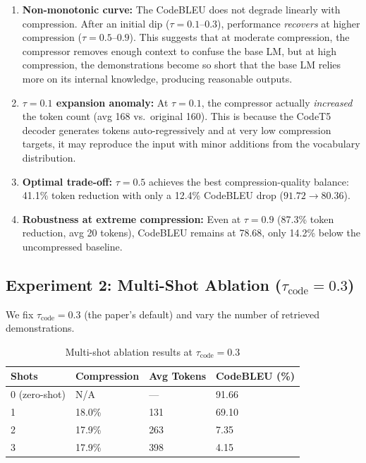 \documentclass[11pt,a4paper]{article}
\begin{document}
\begin{enumerate}[leftmargin=1.5em]
  \item \textbf{Non-monotonic curve:} The CodeBLEU does not degrade linearly with compression. After an initial dip ($\tau=0.1$--$0.3$), performance \emph{recovers} at higher compression ($\tau=0.5$--$0.9$). This suggests that at moderate compression, the compressor removes enough context to confuse the base LM, but at high compression, the demonstrations become so short that the base LM relies more on its internal knowledge, producing reasonable outputs.

  \item \textbf{$\tau=0.1$ expansion anomaly:} At $\tau=0.1$, the compressor actually \emph{increased} the token count (avg 168 vs.\ original 160). This is because the CodeT5 decoder generates tokens auto-regressively and at very low compression targets, it may reproduce the input with minor additions from the vocabulary distribution.

  \item \textbf{Optimal trade-off:} $\tau=0.5$ achieves the best compression-quality balance: 41.1\% token reduction with only a 12.4\% CodeBLEU drop ($91.72 \to 80.36$).

  \item \textbf{Robustness at extreme compression:} Even at $\tau=0.9$ (87.3\% token reduction, avg 20 tokens), CodeBLEU remains at 78.68, only 14.2\% below the uncompressed baseline.
\end{enumerate}

\subsection{Experiment 2: Multi-Shot Ablation ($\tau_{\text{code}}=0.3$)}

We fix $\tau_{\text{code}} = 0.3$ (the paper's default) and vary the number of retrieved demonstrations.

\begin{table}[H]
  \centering
  \caption{Multi-shot ablation results at $\tau_{\text{code}}=0.3$}
  \label{tab:exp2}
  \renewcommand{\arraystretch}{1.15}
  \begin{tabularx}{\textwidth}{C{4cm} C{2.5cm} X C{3cm}}
    \toprule
    \textbf{Shots} & \textbf{Compression} & \textbf{Avg Tokens} & \textbf{CodeBLEU (\%)} \\
     (zero-shot) & N/A   & ---   & 91.66 \\
    1             & 18.0\% & 131 & 69.10 \\
    2             & 17.9\% & 263 & 7.35  \\
    3             & 17.9\% & 398 & 4.15  \\
    \bottomrule
  \end{tabularx}
\end{table}
\end{document}
